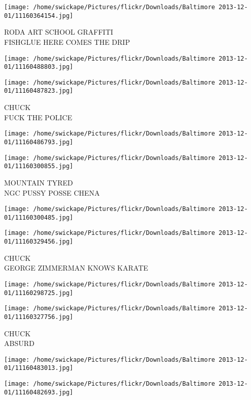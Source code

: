 \documentclass[10pt,letterpaper]{article}
\begin{document}
\vspace{0.25in}
\texttt{[image: /home/swickape/Pictures/flickr/Downloads/Baltimore 2013-12-01/11160364154.jpg]}

RODA ART SCHOOL GRAFFITI\\
FISHGLUE HERE COMES THE DRIP
\pagebreak

\texttt{[image: /home/swickape/Pictures/flickr/Downloads/Baltimore 2013-12-01/11160488803.jpg]}

\vspace{0.25in}
\texttt{[image: /home/swickape/Pictures/flickr/Downloads/Baltimore 2013-12-01/11160487823.jpg]}

CHUCK\\
FUCK THE POLICE
\pagebreak

\texttt{[image: /home/swickape/Pictures/flickr/Downloads/Baltimore 2013-12-01/11160486793.jpg]}

\vspace{0.25in}
\texttt{[image: /home/swickape/Pictures/flickr/Downloads/Baltimore 2013-12-01/11160300855.jpg]}

MOUNTAIN TYRED\\
NGC PUSSY POSSE CHENA
\pagebreak

\texttt{[image: /home/swickape/Pictures/flickr/Downloads/Baltimore 2013-12-01/11160300485.jpg]}

\vspace{0.25in}
\texttt{[image: /home/swickape/Pictures/flickr/Downloads/Baltimore 2013-12-01/11160329456.jpg]}

CHUCK\\
GEORGE ZIMMERMAN KNOWS KARATE
\pagebreak

\texttt{[image: /home/swickape/Pictures/flickr/Downloads/Baltimore 2013-12-01/11160298725.jpg]}

\vspace{0.25in}
\texttt{[image: /home/swickape/Pictures/flickr/Downloads/Baltimore 2013-12-01/11160327756.jpg]}

CHUCK\\
ABSURD
\pagebreak

\texttt{[image: /home/swickape/Pictures/flickr/Downloads/Baltimore 2013-12-01/11160483013.jpg]}

\vspace{0.25in}
\texttt{[image: /home/swickape/Pictures/flickr/Downloads/Baltimore 2013-12-01/11160482693.jpg]}
\end{document}
